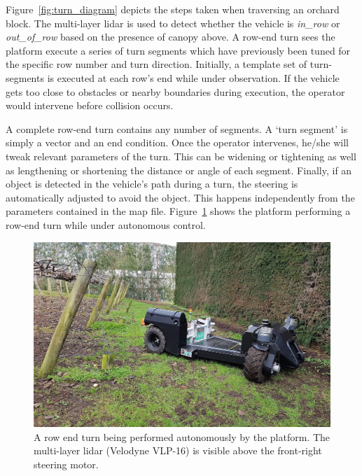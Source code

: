 \documentclass[preprint,authoryear,12pt]{elsarticle}
\begin{document}
    Figure~\ref{fig:turn_diagram} depicts the steps taken when traversing an orchard block.
    The multi-layer lidar is used to detect whether the vehicle is \textit{in\_row} or \textit{out\_of\_row} based on the presence of canopy above.
    A row-end turn sees the platform execute a series of turn segments which have previously been tuned for the specific row number and turn direction.
    Initially, a template set of turn-segments is executed at each row's end while under observation.
    If the vehicle gets too close to obstacles or nearby boundaries during execution, the operator would intervene before collision occurs.

    A complete row-end turn contains any number of segments.
    A `turn segment' is simply a vector and an end condition.
    Once the operator intervenes, he/she will tweak relevant parameters of the turn.
    This can be widening or tightening as well as lengthening or shortening the distance or angle of each segment.
    Finally, if an object is detected in the vehicle's path during a turn, the steering is automatically adjusted to avoid the object.
    This happens independently from the parameters contained in the map file.
    Figure~\ref{fig:suzy_turning} shows the platform performing a row-end turn while under autonomous control.

    \begin{figure}[htb]
        \centering
        \includegraphics[width=\linewidth]{imgs/photos/suzy_turning.jpg}
        \caption{
            A row end turn being performed autonomously by the platform.
            The multi-layer lidar (Velodyne VLP-16) is visible above the front-right steering motor.
        }
        \label{fig:suzy_turning}
    \end{figure}
\end{document}
